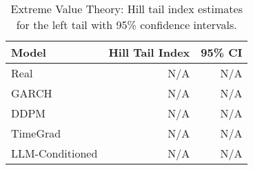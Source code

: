 \begin{table}[htbp]
\centering
\begin{tabular}{lrr}
\toprule
Model & Hill Tail Index & 95\% CI \\
\midrule
Real & N/A & N/A \\
GARCH & N/A & N/A \\
DDPM & N/A & N/A \\
TimeGrad & N/A & N/A \\
LLM-Conditioned & N/A & N/A \\
\bottomrule
\end{tabular}
\caption{Extreme Value Theory: Hill tail index estimates for the left tail with 95\% confidence intervals.}
\label{tab:evt_tailindex}
\end{table}